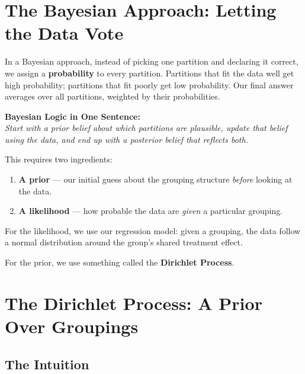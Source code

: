 \documentclass[12pt]{article}
\begin{document}
\section{The Bayesian Approach: Letting the Data Vote}

In a Bayesian approach, instead of picking one partition and declaring it
correct, we assign a \textbf{probability} to every partition. Partitions that
fit the data well get high probability; partitions that fit poorly get low
probability. Our final answer averages over all partitions, weighted by their
probabilities.

\begin{conceptbox}
\textbf{Bayesian Logic in One Sentence:}\\
\textit{Start with a prior belief about which partitions are plausible, update
that belief using the data, and end up with a posterior belief that reflects
both.}
\end{conceptbox}

This requires two ingredients:
\begin{enumerate}
  \item \textbf{A prior} --- our initial guess about the grouping structure
    \textit{before} looking at the data.
  \item \textbf{A likelihood} --- how probable the data are \textit{given} a
    particular grouping.
\end{enumerate}

For the likelihood, we use our regression model: given a grouping, the data
follow a normal distribution around the group's shared treatment effect.

For the prior, we use something called the \textbf{Dirichlet Process}.

\section{The Dirichlet Process: A Prior Over Groupings}

\subsection{The Intuition}
\end{document}
